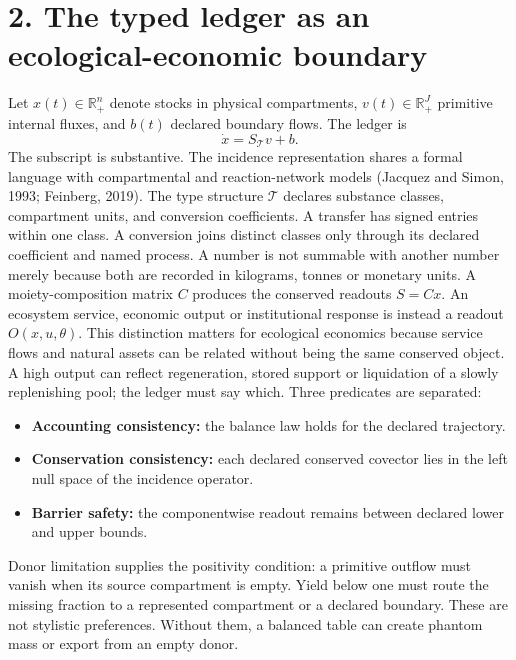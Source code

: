 \documentclass[11pt]{article}
\begin{document}
\section{2. The typed ledger as an ecological-economic boundary}
Let \(x(t)\in\mathbb{R}_+^n\) denote stocks in physical compartments, \(v(t)\in\mathbb{R}_+^J\) primitive internal fluxes, and \(b(t)\) declared boundary flows. The ledger is
\[\dot x=S_{\mathcal T}v+b.\]
The subscript is substantive. The incidence representation shares a formal language with compartmental and reaction-network models (Jacquez and Simon, 1993; Feinberg, 2019). The type structure \(\mathcal T\) declares substance classes, compartment units, and conversion coefficients. A transfer has signed entries within one class. A conversion joins distinct classes only through its declared coefficient and named process. A number is not summable with another number merely because both are recorded in kilograms, tonnes or monetary units.
A moiety-composition matrix \(C\) produces the conserved readouts \(S=Cx\). An ecosystem service, economic output or institutional response is instead a readout \(O(x,u,\theta)\). This distinction matters for ecological economics because service flows and natural assets can be related without being the same conserved object. A high output can reflect regeneration, stored support or liquidation of a slowly replenishing pool; the ledger must say which.
Three predicates are separated:
\begin{itemize}
\item \textbf{Accounting consistency:} the balance law holds for the declared trajectory.
\item \textbf{Conservation consistency:} each declared conserved covector lies in the left null space of the incidence operator.
\item \textbf{Barrier safety:} the componentwise readout remains between declared lower and upper bounds.
\end{itemize}
Donor limitation supplies the positivity condition: a primitive outflow must vanish when its source compartment is empty. Yield below one must route the missing fraction to a represented compartment or a declared boundary. These are not stylistic preferences. Without them, a balanced table can create phantom mass or export from an empty donor.
\end{document}
